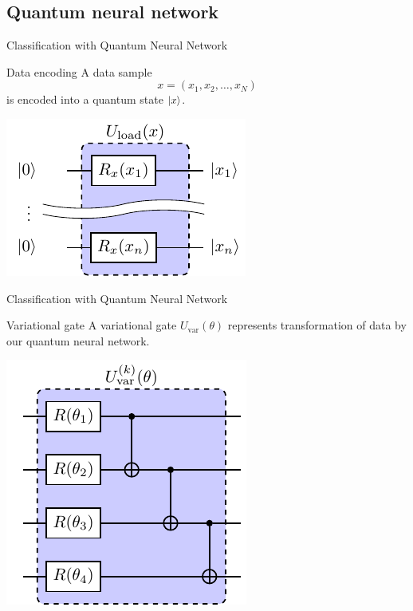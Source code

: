 \subsection{Quantum neural network}
\begin{frame}{Classification with Quantum Neural Network}
    \begin{block}{Data encoding}
        A data sample
        $$x=(x_1, x_2, \ldots, x_N)$$
        is encoded into a quantum state $\ket{x}$.
    \end{block}
    \begin{center}
        \includegraphics{pics/qnn/data_load.pdf}    
    \end{center}
\end{frame}    
\begin{frame}{Classification with Quantum Neural Network}
    \begin{block}{Variational gate}
        A variational gate $U_{\mathrm{var}}(\theta)$ represents transformation of
        data by our quantum neural network.
    \end{block}
    \begin{center}
        \includegraphics[scale=0.9]{pics/qnn/variational_ansatze.pdf}
    \end{center}
\end{frame}
